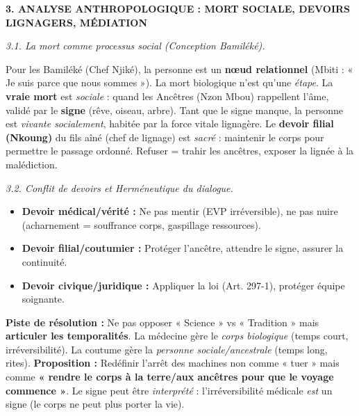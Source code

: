 \documentclass[11pt]{article}
\begin{document}
\begin{exoresolu}
\noindent\textbf{3. ANALYSE ANTHROPOLOGIQUE : MORT SOCIALE, DEVOIRS LIGNAGERS, MÉDIATION}\par
\emph{3.1. La mort comme processus social (Conception Bamiléké).}\par
Pour les Bamiléké (Chef Njiké), la personne est un \textbf{nœud relationnel} (Mbiti : « Je suis parce que nous sommes »). La mort biologique n'est qu'une \emph{étape}. La \textbf{vraie mort} est \emph{sociale} : quand les Ancêtres (Nzon Mbou) rappellent l'âme, validé par le \textbf{signe} (rêve, oiseau, arbre). Tant que le signe manque, la personne est \emph{vivante socialement}, habitée par la force vitale lignagère. Le \textbf{devoir filial (Nkoung)} du fils aîné (chef de lignage) est \emph{sacré} : maintenir le corps pour permettre le passage ordonné. Refuser = trahir les ancêtres, exposer la lignée à la malédiction.\par
\emph{3.2. Conflit de devoirs et Herméneutique du dialogue.}\par
\begin{itemize}
    \item \textbf{Devoir médical/vérité :} Ne pas mentir (EVP irréversible), ne pas nuire (acharnement = souffrance corps, gaspillage ressources).
    \item \textbf{Devoir filial/coutumier :} Protéger l'ancêtre, attendre le signe, assurer la continuité.
    \item \textbf{Devoir civique/juridique :} Appliquer la loi (Art. 297-1), protéger équipe soignante.
\end{itemize}
\textbf{Piste de résolution :} Ne pas opposer « Science » vs « Tradition » mais \textbf{articuler les temporalités}. La médecine gère le \emph{corps biologique} (temps court, irréversibilité). La coutume gère la \emph{personne sociale/ancestrale} (temps long, rites). \textbf{Proposition :} Redéfinir l'arrêt des machines non comme « tuer » mais comme \textbf{« rendre le corps à la terre/aux ancêtres pour que le voyage commence »}. Le signe peut être \emph{interprété} : l'irréversibilité médicale \emph{est} un signe (le corps ne peut plus porter la vie).\par
\vspace{0.3cm}


\end{exoresolu}
\end{document}
